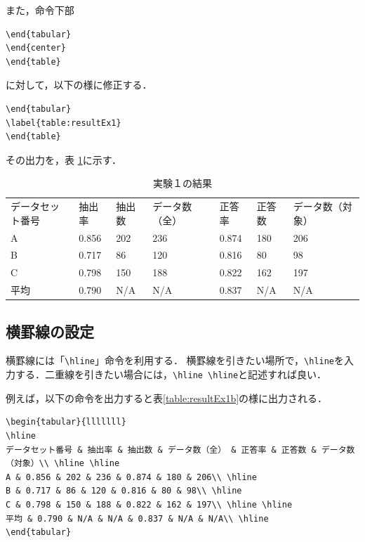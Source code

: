 また，命令下部
\begin{breakbox}
{\small
\begin{verbatim}
\end{tabular}
\end{center}
\end{table}
\end{verbatim}
}
\end{breakbox}
に対して，以下の様に修正する．
\begin{breakbox}
{\small
\begin{verbatim}
\end{tabular}
\label{table:resultEx1}
\end{table}
\end{verbatim}
}
\end{breakbox}


その出力を，表 \ref{table:resultEx1a}に示す．
\begin{table}[H]
\caption{実験１の結果}
\centering
\begin{tabular}{lllllll}
データセット番号 & 抽出率 & 抽出数 & データ数（全） & 正答率 & 正答数 & データ数（対象）\\
A & 0.856 & 202 & 236 & 0.874 & 180 & 206\\
B & 0.717 & 86 & 120 & 0.816 & 80 & 98\\
C & 0.798 & 150 & 188 & 0.822 & 162 & 197\\
平均 & 0.790 & N/A & N/A & 0.837 & N/A & N/A\\
\end{tabular}
\label{table:resultEx1a}
\end{table}


\subsection{横罫線の設定}
横罫線には「\verb+\hline+」命令を利用する．
横罫線を引きたい場所で，\verb+\hline+を入力する．二重線を引きたい場合には，\verb+\hline \hline+と記述すれば良い．

例えば，以下の命令を出力すると表\ref{table:resultEx1b}の様に出力される．
\begin{breakbox}
{\small
\begin{verbatim}
\begin{tabular}{lllllll}
\hline
データセット番号 & 抽出率 & 抽出数 & データ数（全） & 正答率 & 正答数 & データ数（対象）\\ \hline \hline
A & 0.856 & 202 & 236 & 0.874 & 180 & 206\\ \hline
B & 0.717 & 86 & 120 & 0.816 & 80 & 98\\ \hline
C & 0.798 & 150 & 188 & 0.822 & 162 & 197\\ \hline \hline
平均 & 0.790 & N/A & N/A & 0.837 & N/A & N/A\\ \hline
\end{tabular}
\end{verbatim}
}
\end{breakbox}

